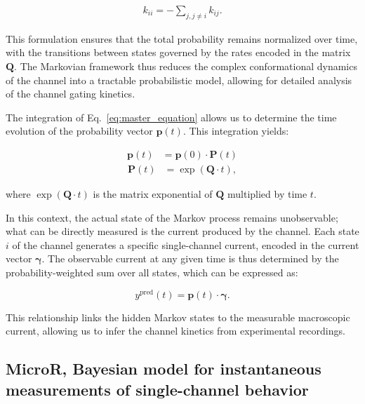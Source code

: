 \documentclass[pdflatex,sn-mathphys-num]{sn-jnl}%
\theoremstyle{thmstyleone}%
\theoremstyle{thmstyletwo}%
\theoremstyle{thmstylethree}%
\begin{document}
\begin{align}
	k_{ii} = -\sum_{j, j \neq i} k_{ij}.
	\label{eq:Q_diagonal_element}
\end{align}

This formulation ensures that the total probability remains normalized over time, with the transitions between states governed by the rates encoded in the matrix \( \boldsymbol{Q} \). The Markovian framework thus reduces the complex conformational dynamics of the channel into a tractable probabilistic model, allowing for detailed analysis of the channel gating kinetics.


The integration of Eq.~\ref{eq:master_equation} allows us to determine the time evolution of the probability vector \( \boldsymbol{p}(t) \). This integration yields:


\begin{align}
	\boldsymbol{p}(t) &= \boldsymbol{p}(0) \cdot \boldsymbol{P}(t)
	\label{eq:master_equation_solution}
\end{align}
\begin{align}
	\boldsymbol{P} (t) &= \exp(\boldsymbol{Q} \cdot t),
	\label{eq:Transition_Matrix_definition}
\end{align}


where \( \exp(\boldsymbol{Q} \cdot t) \) is the matrix exponential of \( \boldsymbol{Q} \) multiplied by time \( t \). 

In this context, the actual state of the Markov process remains unobservable; what can be directly measured is the current produced by the channel. Each state \( i \) of the channel generates a specific single-channel current, encoded in the current vector \( \boldsymbol{\gamma} \). The observable current at any given time is thus determined by the probability-weighted sum over all states, which can be expressed as:

\begin{equation}
	y^{\text{pred}}(t) = \boldsymbol{p}(t) \cdot \boldsymbol{\gamma}.
	\label{eq:single_channel_prediction}
\end{equation}

This relationship links the hidden Markov states to the measurable macroscopic current, allowing us to infer the channel kinetics from experimental recordings.



\subsection{MicroR, Bayesian model for instantaneous measurements of single-channel behavior}
\end{document}
